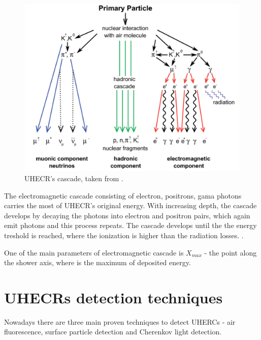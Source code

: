 \begin{figure}[H]
 \centering
 \includegraphics[scale = 0.3]{./pictures/cascade}
 \caption{UHECR's cascade, taken from \cite{Cascades}.}
 \label{cascade}
 
\end{figure}

\par

The electromagnetic cascade consisting of electron, positrons, gama photons carries the most of UHECR's original energy. With increasing depth, the cascade develops by decaying the photons into electron and positron pairs, which again emit photons and this process repeats. The cascade develops until the the energy treshold is reached, where the ionization is higher than the radiation losses. \cite{Tomankova2016_1000061954}.


\par
One of the main parameters of electromagnetic cascade is $X_{max}$ - the point along the shower axis, where is the maximum of deposited energy.

\section{UHECRs detection techniques}
Nowadays there are three main proven techniques to detect UHERCs - 
air fluorescence, surface particle detection and Cherenkov light detection.

